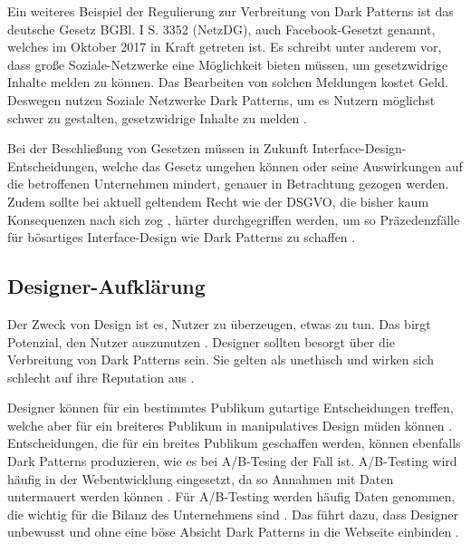 \documentclass[conference,compsoc,final,a4paper]{IEEEtran}
\begin{document}
Ein weiteres Beispiel der Regulierung zur Verbreitung von Dark Patterns ist das deutsche Gesetz BGBl. I S. 3352 (\ac{NetzDG}), auch Facebook-Gesetzt genannt, welches im Oktober 2017 in Kraft getreten ist. Es schreibt unter anderem vor, dass große Soziale-Netzwerke eine Möglichkeit bieten müssen, um gesetzwidrige Inhalte melden zu können. Das Bearbeiten von solchen Meldungen kostet Geld. Deswegen nutzen Soziale Netzwerke Dark Patterns, um es Nutzern möglichst schwer zu gestalten, gesetzwidrige Inhalte zu melden \autocite{Rieger2020}.


Bei der Beschließung von Gesetzen müssen in Zukunft Interface-Design-Entscheidungen, welche das Gesetz umgehen können oder seine Auswirkungen auf die betroffenen Unternehmen mindert, genauer in Betrachtung gezogen werden. Zudem sollte bei aktuell geltendem Recht wie der \ac{DSGVO}, die bisher kaum Konsequenzen nach sich zog \autocite{Nouwens2020}, härter durchgegriffen werden, um so Präzedenzfälle für bösartiges Interface-Design wie Dark Patterns zu schaffen \autocite{Rieger2020}.

\subsection{Designer-Aufklärung}
Der Zweck von Design ist es, Nutzer zu überzeugen, etwas zu tun. Das birgt Potenzial, den Nutzer auszunutzen \autocites{OinasKukkonen2009}{Sengers2005}. Designer sollten besorgt über die Verbreitung von Dark Patterns sein. Sie gelten als unethisch und wirken sich schlecht auf ihre Reputation aus \autocite{Narayanan2020}.

Designer können für ein bestimmtes Publikum gutartige Entscheidungen treffen, welche aber für ein breiteres Publikum in manipulatives Design müden können \autocite{Gray_2018}. Entscheidungen, die für ein breites Publikum geschaffen werden, können ebenfalls Dark Patterns produzieren, wie es bei A/B-Tesing der Fall ist. A/B-Testing wird häufig in der Webentwicklung eingesetzt, da so Annahmen mit Daten untermauert werden können \autocite{Kohavi2017}. Für A/B-Testing werden häufig Daten genommen, die wichtig für die Bilanz des Unternehmens sind \autocites{Kohavi2017}{Narayanan2020}. Das führt dazu, dass Designer unbewusst und ohne eine böse Absicht Dark Patterns in die Webseite einbinden \autocite{Narayanan2020}.
\end{document}
